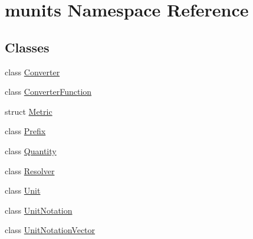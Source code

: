 \hypertarget{namespacemunits}{}\section{munits Namespace Reference}
\label{namespacemunits}
\subsection*{Classes}
\begin{DoxyCompactItemize}
\item 
class \hyperlink{classmunits_1_1_converter}{Converter}
\item 
class \hyperlink{classmunits_1_1_converter_function}{Converter\+Function}
\item 
struct \hyperlink{structmunits_1_1_metric}{Metric}
\item 
class \hyperlink{classmunits_1_1_prefix}{Prefix}
\item 
class \hyperlink{classmunits_1_1_quantity}{Quantity}
\item 
class \hyperlink{classmunits_1_1_resolver}{Resolver}
\item 
class \hyperlink{classmunits_1_1_unit}{Unit}
\item 
class \hyperlink{classmunits_1_1_unit_notation}{Unit\+Notation}
\item 
class \hyperlink{classmunits_1_1_unit_notation_vector}{Unit\+Notation\+Vector}
\end{DoxyCompactItemize}

